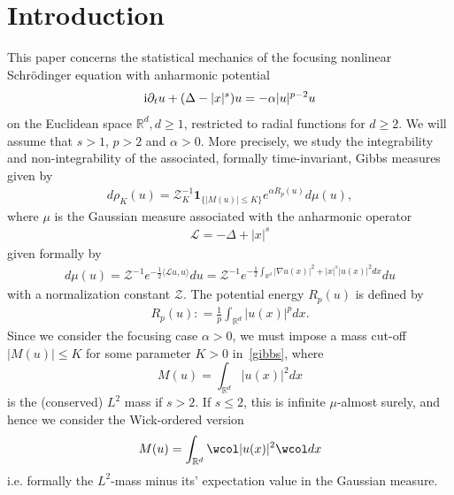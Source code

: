 \documentclass[%
11pt,  reqno]{amsart}
\theoremstyle{remarkstyle}
\newcommand{\1}{\hspace{0.2mm}\text{I}\hspace{0.2mm}}
\newcommand{\R}{\mathbb{R}}
\renewcommand{\L}{\mathcal{L}}
\newcommand{\al}{\alpha}
\newcommand{\wick}[1]{\wcol#1\wcol}
\newcommand{\jb}[1]
{\langle #1 \rangle}
\newcommand{\ind}{\mathbf 1}
\numberwithin{equation}{section}
\numberwithin{theorem}{section}
\begin{document}
	\date{December 2023}
	
	\maketitle
	
	\vspace{-5mm}
	
	\tableofcontents
	
	
	\section{Introduction}
	
	This paper concerns the statistical mechanics of the focusing nonlinear Schr\"odinger equation with anharmonic potential
	\[
	{\rm i} \partial_t u + (\Delta -|x|^s) u = -  \alpha |u|^{p-2} u
	\]
	on the Euclidean space $\mathbb R^d, d\geq 1$, restricted to radial functions for $d\geq 2$. We will assume that $s>1$, $p>2$ and $\alpha>0$. More precisely, we study the integrability and non-integrability of the associated, formally time-invariant, Gibbs measures given by
	\begin{align}
		\label{gibbs}
		d\rho_K (u) = \mathcal Z_K^{-1} \ind_{\{|M(u) | \le K\}} e^{ \al R_p(u)} d\mu(u),
	\end{align}
	where $\mu$ is the Gaussian measure associated with the anharmonic operator
	\begin{align}
		\label{anharmonic}
		\mathcal L = -\Delta + |x|^s
	\end{align}
	given formally by 
	\begin{align}
		\label{gaussian}
		d \mu (u)  = \mathcal Z^{-1} e^{- \frac12 \jb{\L u, u} } du =  \mathcal Z^{-1} e^{- \frac12 \int_{\R^d} |\nabla u(x)|^2 + |x|^s|u(x)|^2 dx } du
	\end{align}
	with a normalization constant $\mathcal Z$. The potential energy $R_p (u)$ is defined by
	\begin{align}
		\label{Rp}
		R_p (u) : = {\frac{1}{p} \int_{\R^d} |u(x)|^p dx}.
	\end{align}
	Since we consider the focusing case $\alpha >0$, we must impose a mass cut-off $|M(u) | \le K$ for some parameter $K>0$ in~\eqref{gibbs}, where 
	\[
	M(u) = \int_{\R^d} |u(x)|^2 dx
	\]
	is the (conserved) $L^2$ mass if $s>2$. If $s\leq 2$, this is infinite $\mu$-almost surely, and hence we consider the Wick-ordered version
	\[
	M(u) = \int_{\R^d} \wick{|u(x)|^2} dx
	\]
	i.e. formally the $L^2$-mass minus its' expectation value in the Gaussian measure.
	
\end{document}
